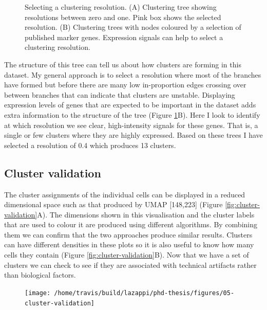 \documentclass[11pt,a4paper,titlepage,twoside,openright]{style/unimelbthesis}
\theoremstyle{definition}
\theoremstyle{definition}
\theoremstyle{definition}
\theoremstyle{remark}
\begin{document}
\begin{mainmatter}
\begin{figure}
\caption[Selecting a clustering resolution.]{Selecting a clustering resolution. (A) Clustering tree showing resolutions between zero and one. Pink box shows the selected resolution. (B) Clustering trees with nodes coloured by a selection of published marker genes. Expression signals can help to select a clustering resolution.}\label{fig:resolution-selection}
\end{figure}





The structure of this tree can tell us about how clusters are forming in this dataset. My general approach is to select a resolution where most of the branches have formed but before there are many low in-proportion edges crossing over between branches that can indicate that clusters are unstable. Displaying expression levels of genes that are expected to be important in the dataset adds extra information to the structure of the tree (Figure \ref{fig:resolution-selection}B). Here I look to identify at which resolution we see clear, high-intensity signals for these genes. That is, a single or few clusters where they are highly expressed. Based on these trees I have selected a resolution of 0.4 which produces 13 clusters.

\hypertarget{cluster-validation}{%
\subsection{Cluster validation}\label{cluster-validation}}

The cluster assignments of the individual cells can be displayed in a reduced dimensional space such as that produced by UMAP {[}148,223{]} (Figure \ref{fig:cluster-validation}A). The dimensions shown in this visualisation and the cluster labels that are used to colour it are produced using different algorithms. By combining them we can confirm that the two approaches produce similar results. Clusters can have different densities in these plots so it is also useful to know how many cells they contain (Figure \ref{fig:cluster-validation}B). Now that we have a set of clusters we can check to see if they are associated with technical artifacts rather than biological factors.

\begin{figure}

{\centering \texttt{[image: /home/travis/build/lazappi/phd-thesis/figures/05-cluster-validation]} 

}


\end{figure}
\end{mainmatter}
\end{document}
